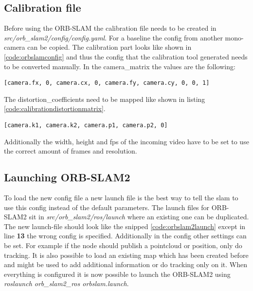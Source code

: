 \subsection{Calibration file}\label{ref:calibrationorbslam}
Before using the ORB-SLAM the calibration file needs to be created in \textit{src/orb\_slam2/config/config.yaml}. For a baseline the config from another mono-camera can be copied. The calibration part looks like shown in \ref{code:orbslamconfig} and thus the config that the calibration tool generated needs to be converted manually. In the camera\_matrix the values are the following:
\begin{lstlisting}[language=XML,caption={Matrix listing},label={code:calibrationmatrix}]
	  	[camera.fx, 0, camera.cx, 0, camera.fy, camera.cy, 0, 0, 1]
\end{lstlisting}
The distortion\_coefficients need to be mapped like shown in listing \ref{code:calibrationdistortionmatrix}.
\begin{lstlisting}[language=XML,caption={Matrix listing},label={code:calibrationdistortionmatrix}]
	  	[camera.k1, camera.k2, camera.p1, camera.p2, 0]
\end{lstlisting}
Additionally the width, height and \gls{fps} of the incoming video have to be set to use the correct amount of frames and resolution.\newline


\subsection{Launching ORB-SLAM2}
To load the new config file a new launch file is the best way to tell the \gls{slam} to use this config instead of the default parameters. The launch files for ORB-SLAM2 sit in \textit{src/orb\_slam2/ros/launch} where an existing one can be duplicated. The new launch-file should look like the snipped \ref{code:orbslam2launch} except in line \textbf{13} the wrong config is specified. Additionally in the config other settings can be set. For example if the node should publish a pointcloud or position, only do tracking. It is also possible to load an existing map which has been created before and might be used to add additional information or do tracking only on it. When everything is configured it is now possible to launch the ORB-SLAM2 using \textit{roslaunch orb\_slam2\_ros orbslam.launch}. \newline


